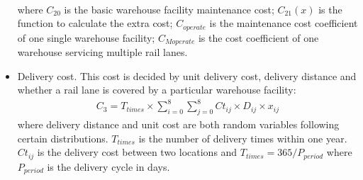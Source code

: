 \begin{itemize}
\begin{align}
	\end{align}
	where $C_{20}$ is the basic warehouse facility maintenance cost;
	$C_{21}(x)$ is the function to calculate the extra cost;
	$C_{operate}$ is the maintenance cost coefficient of one single warehouse facility;
	$C_{Moperate}$ is the cost coefficient of one warehouse servicing multiple rail lanes.
	\item Delivery cost. This cost is decided by unit delivery cost, delivery distance and whether a rail lane is covered by a particular warehouse facility:
	\begin{align}
		C_3 = T_{times} \times \sum_{i = 0}^8 \sum_{j = 0}^8 Ct_{ij} \times D_{ij} \times x_{ij}
	\end{align}
	where delivery distance and unit cost are both random variables following certain distributions.
	$T_{times}$ is the number of delivery times within one year.
	$Ct_{ij}$ is the delivery cost between two locations and $T_{times} = 365 / P_{period}$ where $P_{period}$ is the delivery cycle in days.
\end{itemize}

